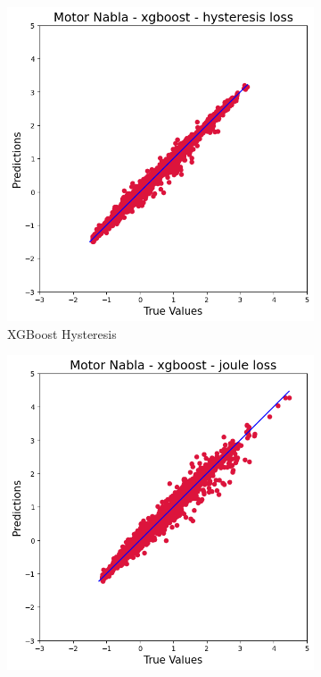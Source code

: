 \documentclass{article}
\begin{document}
\begin{figure}[!htbp]
    \vspace{0.3cm}
    
    \begin{subfigure}[b]{0.23\textwidth}
        \centering
        \includegraphics[width=\textwidth]{images/Nabla/xgboost_hysteresis.png}
        \caption{XGBoost Hysteresis}
    \end{subfigure}
    \hfill
    \begin{subfigure}[b]{0.23\textwidth}
        \centering
        \includegraphics[width=\textwidth]{images/Nabla/xgboost_joule.png}

\end{subfigure}
\end{figure}
\end{document}
